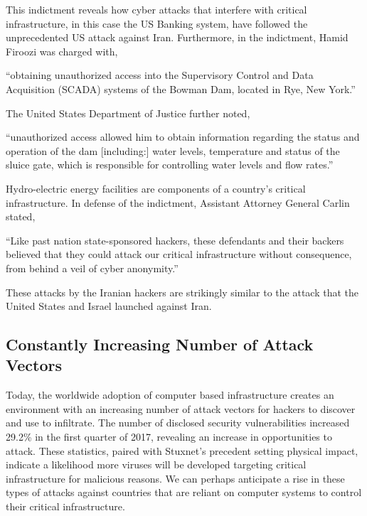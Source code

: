 \documentclass[12pt]{article}
\begin{document}
\begin{multicols}{2}
This indictment reveals how cyber attacks that interfere with critical infrastructure, in this case the US Banking system, have followed the unprecedented US attack against Iran. Furthermore, in the indictment, Hamid Firoozi was charged with,

\begin{displayquote}
``obtaining unauthorized access into the Supervisory Control and Data Acquisition (SCADA) systems of the Bowman Dam, located in Rye, New York.''\cite{sevenIraniansIndicted}
\end{displayquote}

The United States Department of Justice further noted,

\begin{displayquote}
``unauthorized access allowed him to obtain information regarding the status and operation of the dam [including:] water levels, temperature and status of the sluice gate, which is responsible for controlling water levels and flow rates.''\cite{sevenIraniansIndicted}
\end{displayquote}

Hydro-electric energy facilities are components of a country's critical infrastructure. In defense of the indictment, Assistant Attorney General Carlin stated,

\begin{displayquote}
``Like past nation state-sponsored hackers, these defendants and their backers believed that they could attack our critical infrastructure without consequence, from behind a veil of cyber anonymity.''\cite{sevenIraniansIndicted}
\end{displayquote}

These attacks by the Iranian hackers are strikingly similar to the attack that the United States and Israel launched against Iran.

\subsection{Constantly Increasing Number of Attack Vectors}

Today, the worldwide adoption of computer based infrastructure creates an environment with an increasing number of attack vectors for hackers to discover and use to infiltrate. The number of disclosed security vulnerabilities increased 29.2\% in the first quarter of 2017, revealing an increase in opportunities to attack.\cite{industrialCyberVulnerabilities} These statistics, paired with Stuxnet's precedent setting physical impact, indicate a likelihood more viruses will be developed targeting critical infrastructure for malicious reasons.\cite{industrialCyberVulnerabilities} We can perhaps anticipate a rise in these types of attacks against countries that are reliant on computer systems to control their critical infrastructure.


\end{multicols}
\end{document}
